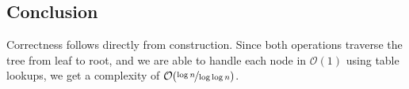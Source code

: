 \documentclass[a4paper,oneside,article,11pt]{memoir}
\begin{document}
\subsection{Conclusion}
Correctness follows directly from construction. Since both operations traverse the tree from leaf to root, and we are able to handle each node in $\mathcal{O}(1)$ using table lookups, we get a complexity of $\mathcal{O}(\nicefrac{\log n}{\log \log n})$.



\end{document}
